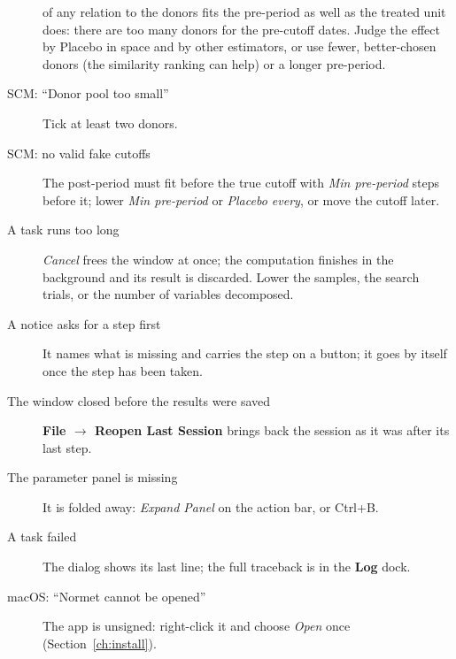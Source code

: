 \documentclass[11pt]{report}
\newcommand{\tab}[1]{\textbf{#1}}
\begin{document}
\begin{description}
        of any relation to the donors fits the pre-period as well as the treated unit
        does: there are too many donors for the pre-cutoff dates. Judge the effect by
        Placebo in space and by other estimators, or use fewer, better-chosen donors (the
        similarity ranking can help) or a longer pre-period.
  \item[SCM: ``Donor pool too small''] Tick at least two donors.
  \item[SCM: no valid fake cutoffs] The post-period must fit before the true cutoff with
        \emph{Min pre-period} steps before it; lower \emph{Min pre-period} or
        \emph{Placebo every}, or move the cutoff later.
  \item[A task runs too long] \emph{Cancel} frees the window at once; the computation
        finishes in the background and its result is discarded. Lower the samples, the
        search trials, or the number of variables decomposed.
  \item[A notice asks for a step first] It names what is missing and carries the step on
        a button; it goes by itself once the step has been taken.
  \item[The window closed before the results were saved] \tab{File $\rightarrow$ Reopen
        Last Session} brings back the session as it was after its last step.
  \item[The parameter panel is missing] It is folded away: \emph{Expand Panel} on the
        action bar, or Ctrl+B.
  \item[A task failed] The dialog shows its last line; the full traceback is in the
        \tab{Log} dock.
  \item[macOS: ``Normet cannot be opened''] The app is unsigned: right-click it and choose
        \emph{Open} once (Section~\ref{ch:install}).
\end{description}
\end{document}
